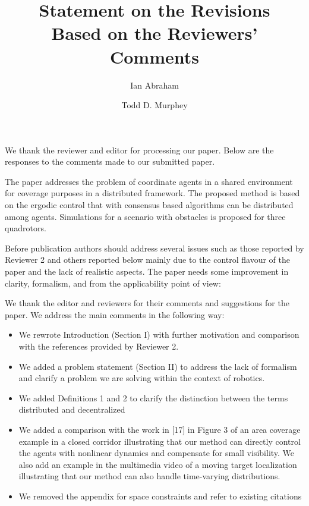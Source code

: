 \documentclass[10pt]{article}
\title{Statement on the Revisions \\
  Based on the Reviewers' Comments}
\author{Ian Abraham \and Todd D. Murphey}
\date{}
\begin{document}
We thank the reviewer and editor for processing our paper. Below are the responses to the comments made to our submitted paper. 


\Editor{}
\begin{response}{
The paper addresses the problem of coordinate agents in a shared
environment for coverage purposes in a distributed framework. The
proposed method is based on the ergodic control that with consensus
based algorithms can be distributed among agents. Simulations for a
scenario with obstacles is proposed for three quadrotors. 

Before publication authors should address several issues such as those
reported by Reviewer 2 and others reported below mainly due to the
control flavour of the paper and the lack of realistic aspects.
The paper needs some improvement in clarity, formalism, and from the
applicability point of view: \\
}
We thank the editor and reviewers for their comments and suggestions for the paper.
We address the main comments in the following way:
\begin{itemize}
\item We rewrote Introduction (Section I) with further motivation and comparison with the references provided by Reviewer 2. 
\item We added a problem statement (Section II) to address the lack of formalism and clarify a problem we are solving within the context of robotics.
\item We added Definitions 1 and 2 to clarify the distinction between the terms distributed and decentralized
\item We added a comparison with the work in [17] in Figure 3 of an area coverage example in a closed corridor illustrating that our method can directly control the agents with nonlinear dynamics and compensate for small visibility. 
We also add an example in the multimedia video of a moving target localization illustrating that our method can also handle time-varying distributions.
\item We removed the appendix for space constraints and refer to existing citations
\end{itemize}
\end{response}
\end{document}
